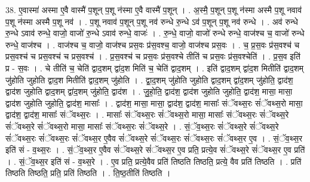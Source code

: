 \documentclass[17pt]{extarticle}
\begin{document}
38. ए॒वास्मा॑ अस्मा ए॒वै वास्मै॑ प॒शून् प॒शू न॑स्मा ए॒वै वास्मै॑ प॒शून् । . अ॒स्मै॒ प॒शून् प॒शू न॑स्मा अस्मै प॒शू नवाव॑ प॒शू न॑स्मा अस्मै प॒शू नव॑ । . प॒शू नवाव॑ प॒शून् प॒शू नव॑ रुन्धे रु॒न्धे ऽव॑ प॒शून् प॒शू नव॑ रुन्धे । . अव॑ रुन्धे रु॒न्धे ऽवाव॑ रुन्धे॒ वाजो॒ वाजो॑ रु॒न्धे ऽवाव॑ रुन्धे॒ वाजः॑ । . रु॒न्धे॒ वाजो॒ वाजो॑ रुन्धे रुन्धे॒ वाज॑श्च च॒ वाजो॑ रुन्धे रुन्धे॒ वाज॑श्च । . वाज॑श्च च॒ वाजो॒ वाज॑श्च प्रस॒वः प्र॑स॒वश्च॒ वाजो॒ वाज॑श्च प्रस॒वः । . च॒ प्र॒स॒वः प्र॑स॒वश्च॑ च प्रस॒वश्च॑ च प्रस॒वश्च॑ च प्रस॒वश्च॑ । . प्र॒स॒वश्च॑ च प्रस॒वः प्र॑स॒वश्चे तीति॑ च प्रस॒वः प्र॑स॒वश्चेति॑ । . प्र॒स॒व इति॑ प्र - स॒वः । . चे तीति॑ च॒ चेति॑ द्वाद॒शम् द्वा॑द॒श मिति॑ च॒ चेति॑ द्वाद॒शम् । . इति॑ द्वाद॒शम् द्वा॑द॒श मितीति॑ द्वाद॒शम् जु॑होति जुहोति द्वाद॒श मितीति॑ द्वाद॒शम् जु॑होति । . द्वा॒द॒शम् जु॑होति जुहोति द्वाद॒शम् द्वा॑द॒शम् जु॑होति॒ द्वाद॑श॒ द्वाद॑श जुहोति द्वाद॒शम् द्वा॑द॒शम् जु॑होति॒ द्वाद॑श । . जु॒हो॒ति॒ द्वाद॑श॒ द्वाद॑श जुहोति जुहोति॒ द्वाद॑श॒ मासा॒ मासा॒ द्वाद॑श जुहोति जुहोति॒ द्वाद॑श॒ मासाः᳚ । . द्वाद॑श॒ मासा॒ मासा॒ द्वाद॑श॒ द्वाद॑श॒ मासाः᳚ संॅवथ्स॒रः सं॑ॅवथ्स॒रो मासा॒ द्वाद॑श॒ द्वाद॑श॒ मासाः᳚ संॅवथ्स॒रः । . मासाः᳚ संॅवथ्स॒रः सं॑ॅवथ्स॒रो मासा॒ मासाः᳚ संॅवथ्स॒रः सं॑ॅवथ्स॒रे सं॑ॅवथ्स॒रे सं॑ॅवथ्स॒रो मासा॒ मासाः᳚ संॅवथ्स॒रः सं॑ॅवथ्स॒रे । . सं॒ॅव॒थ्स॒रः सं॑ॅवथ्स॒रे सं॑ॅवथ्स॒रे सं॑ॅवथ्स॒रः सं॑ॅवथ्स॒रः सं॑ॅवथ्स॒र ए॒वैव सं॑ॅवथ्स॒रे सं॑ॅवथ्स॒रः सं॑ॅवथ्स॒रः सं॑ॅवथ्स॒र ए॒व । . सं॒ॅव॒थ्स॒र इति॑ सं - व॒थ्स॒रः । . सं॒ॅव॒थ्स॒र ए॒वैव सं॑ॅवथ्स॒रे सं॑ॅवथ्स॒र ए॒व प्रति॒ प्रत्ये॒व सं॑ॅवथ्स॒रे सं॑ॅवथ्स॒र ए॒व प्रति॑ । . सं॒ॅव॒थ्स॒र इति॑ सं - व॒थ्स॒रे । . ए॒व प्रति॒ प्रत्ये॒वैव प्रति॑ तिष्ठति तिष्ठति॒ प्रत्ये॒ वैव प्रति॑ तिष्ठति । . प्रति॑ तिष्ठति तिष्ठति॒ प्रति॒ प्रति॑ तिष्ठति । . ति॒ष्ठ॒तीति॑ तिष्ठति । \newline
\pagebreak
{}
\end{document}
